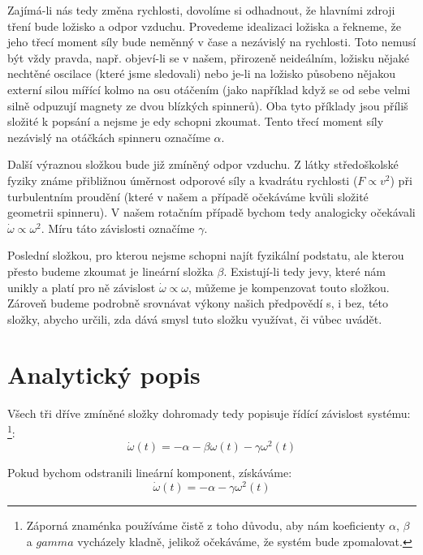 \documentclass[12pt, a4paper,
 twoside,        %
 openright
]{report}
\begin{document}
Zajímá-li nás tedy změna rychlosti, dovolíme si odhadnout, že hlavními zdroji tření bude ložisko a odpor vzduchu. Provedeme idealizaci ložiska a řekneme, že jeho třecí moment síly bude neměnný v čase a nezávislý na rychlosti. Toto nemusí být vždy pravda, např. objeví-li se v našem, přirozeně neideálním, ložisku nějaké nechtěné oscilace (které jsme sledovali) nebo je-li na ložisko působeno nějakou externí silou mířící kolmo na osu otáčením (jako například když se od sebe velmi silně odpuzují magnety ze dvou blízkých spinnerů). Oba tyto příklady jsou příliš složité k popsání a nejsme je edy schopni zkoumat. Tento třecí moment síly nezávislý na otáčkách spinneru označíme $\alpha$.

Další výraznou složkou bude již zmíněný odpor vzduchu. Z látky středoškolské fyziky známe přibližnou úměrnost odporové síly a kvadrátu rychlosti ($F \propto v^2$) při turbulentním proudění (které v našem a případě očekáváme kvůli složité geometrii spinneru). V našem rotačním případě bychom tedy analogicky očekávali $\dot{\omega} \propto \omega^2$. Míru táto závislosti označíme $\gamma$.

Poslední složkou, pro kterou nejsme schopni najít fyzikální podstatu, ale kterou přesto budeme zkoumat je lineární složka $\beta$. Existují-li tedy jevy, které nám unikly a platí pro ně závislost $\dot{\omega} \propto \omega$, můžeme je kompenzovat touto složkou. Zároveň budeme podrobně srovnávat výkony našich předpovědí s, i bez, této složky, abycho určili, zda dává smysl tuto složku využívat, či vůbec uvádět.

\clearpage

\section{Analytický popis}

Všech tři dříve zmíněné složky dohromady tedy popisuje řídící závislost systému: \footnote{Záporná znaménka používáme čistě z toho důvodu, aby nám koeficienty $\alpha$, $\beta$ a $gamma$ vycházely kladně, jelikož očekáváme, že systém bude zpomalovat.}:
\begin{equation}
    \label{eq:drag_diff_wlin}
    \dot{\omega}(t) = - \alpha - \beta \omega(t) - \gamma \omega^2(t)
\end{equation}

Pokud bychom odstranili lineární komponent, získáváme:
\begin{equation}
    \label{eq:drag_diff}
    \dot{\omega}(t) = - \alpha - \gamma \omega^2(t)
\end{equation}
\end{document}

